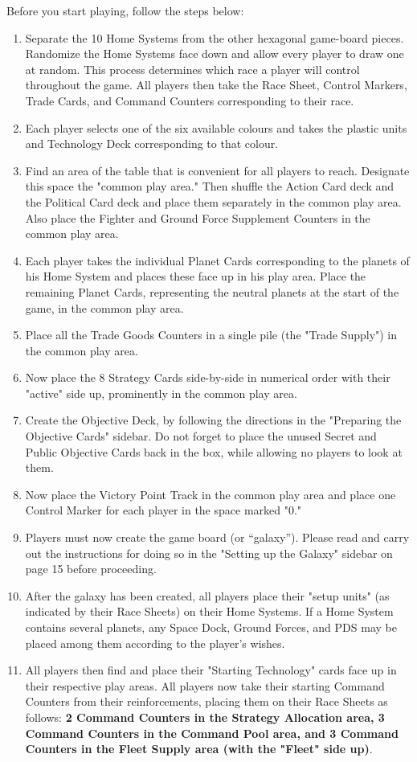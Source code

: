 \documentclass[11pt,fleqn]{book} %
\begin{document}
Before you start playing, follow the steps below:
\begin{enumerate}
\item Separate the 10 Home Systems from the other hexagonal game-board pieces. Randomize the Home Systems face down and allow every player to draw one at random. This process determines which race a player will control throughout the game. All players then take the Race Sheet, Control Markers, Trade Cards, and Command Counters corresponding to their race.
\item Each player selects one of the six available colours and takes the plastic units and Technology Deck corresponding to that colour.
\item Find an area of the table that is convenient for all players to reach. Designate this space the "common play area." Then shuffle the Action Card deck and the Political Card deck and place them separately in the common play area. Also place the Fighter and Ground Force Supplement Counters in the common play area.
\item Each player takes the individual Planet Cards corresponding to the planets of his Home System and places these face up in his play area. Place the remaining Planet Cards, representing the neutral planets at the start of the game, in the common play area.

\item Place all the Trade Goods Counters in a single pile (the "Trade Supply") in the common play area.
\item Now place the 8 Strategy Cards side-by-side in numerical order with their "active" side up, prominently in the common play area.
\item Create the Objective Deck, by following the directions in the "Preparing the Objective Cards" sidebar. Do not forget to place the unused Secret and Public Objective Cards back in the box, while allowing no players to look at them.
\item Now place the Victory Point Track in the common play area and place one Control Marker for each player in the space marked "0."
\item Players must now create the game board (or “galaxy”). Please read and carry out the instructions for doing so in the "Setting up the Galaxy" sidebar on page 15 before proceeding.
\item After the galaxy has been created, all players place their "setup units" (as indicated by their Race Sheets) on their Home Systems. If a Home System contains several planets, any Space Dock, Ground Forces, and PDS may be placed among them according to the player’s wishes.
\item All players then find and place their "Starting Technology" cards face up in their respective play areas. All players now take their starting Command Counters from their reinforcements, placing them on their Race Sheets as follows: \textbf{2 Command Counters in the Strategy Allocation area, 3 Command Counters in the Command Pool area, and 3 Command Counters in the Fleet Supply area (with the "Fleet" side up)}.
\end{enumerate}
\end{document}
